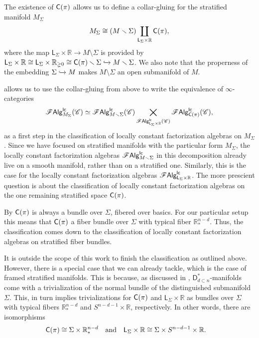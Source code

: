 \documentclass[../text.tex]{subfiles}
\begin{document}
\begin{construction}
    The existence of $\cone(\pi)$ allows us to define a collar-gluing for the stratified manifold $M_\Sigma$
    \begin{equation}\label{eq:M_Sigma_decomposition}
        M_\Sigma \cong \left( M \setminus \Sigma \right) \coprod_{\mathsf{L}_\Sigma \times \mathbb{R}} \cone(\pi),
    \end{equation}
    where the map $\mathsf{L}_\Sigma \times \mathbb{R} \rightarrow M \setminus \Sigma$ is provided by $\mathsf{L}_\Sigma \times \mathbb{R} \cong \mathsf{L}_\Sigma \times \mathbb{R}_{\gneq 0} \cong \cone(\pi) \setminus \Sigma \xhookrightarrow{} M \setminus \Sigma$. We also note that the properness of the embedding $\Sigma \xhookrightarrow{} M$ makes $M \setminus \Sigma$ an open submanifold of $M$.
\end{construction}


 allows us to use the collar-gluing from above to write the equivalence of $\infty$-categories
%
\begin{equation}
    \lcfa_{M_\Sigma} (\catC) \simeq \lcfa_{M \setminus \Sigma} (\catC) \bigtimes_{\lcfa_{\mathsf{L}_\Sigma \times \mathbb{R}} (\catC)} \lcfa_{\cone(\pi)} (\catC),
\end{equation}
%
as a first step in the classification of locally constant factorization algebras on $M_{\Sigma}$. Since we have focused on stratified manifolds with the particular form $M_{\Sigma}$, the locally constant factorization algebras $\mathscr{F} \mathsf{Alg}^{\mathsf{lc}}_{M \smallsetminus \Sigma}$ in this decomposition already live on a smooth manifold, rather than on a stratified one. Similarly, this is the case for the locally constant factorization algebras $\mathscr{F} \mathsf{Alg}^{\mathsf{lc}}_{\mathsf{L}_\Sigma \times \mathbb{R}}$. The more prescient question is about the classification of locally constant factorization algebras on the one remaining stratified space $\cone(\pi)$. 

By \cite[ex.3.6.6]{aft_localstrut} $\cone(\pi)$ is always a bundle over $\Sigma$, fibered over basics. For our particular setup this means that $\cone(\pi)$ a fiber bundle over $\Sigma$ with typical fiber $\mathbb{R}^{n-d}_*$. Thus, the classification comes down to the classification of locally constant factorization algebras on stratified fiber bundles.

It is outside the scope of this work to finish the classification as outlined above. However, there is a special case that we can already tackle, which is the case of framed stratified manifolds. This is because, as discussed in , $\mathsf{D}_{d \subset n}^*$-manifolds come with a trivialization of the normal bundle of the distinguished submanifold $\Sigma$. This, in turn implies trivializations for $\cone(\pi)$ and $\mathsf{L}_{\Sigma} \times \mathbb{R}$ as bundles over $\Sigma$ with typical fibers $\mathbb{R}^{n-d}_*$ and $S^{n-d-1} \times \mathbb{R}$, respectively. In other words, there are isomorphisms
%
\begin{align}
    &\cone(\pi) \cong \Sigma \times \mathbb{R}^{n-d}_*& &\mathrm{and}& &\mathsf{L}_{\Sigma} \times \mathbb{R} \cong \Sigma \times S^{n-d-1} \times \mathbb{R}.&
\end{align}
\end{document}
